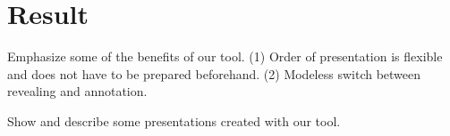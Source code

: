 \section{Result}
Emphasize some of the benefits of our tool.
(1) Order of presentation is flexible and does not have to be prepared beforehand. 
(2) Modeless switch between revealing and annotation.

Show and describe some presentations created with our tool.
